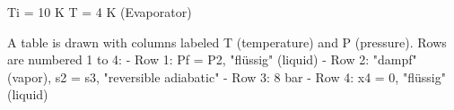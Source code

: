 Ti = 10 K  
T = 4 K (Evaporator)

A table is drawn with columns labeled T (temperature) and P (pressure). Rows are numbered 1 to 4:  
- Row 1: Pf = P2, "flüssig" (liquid)  
- Row 2: "dampf" (vapor), s2 = s3, "reversible adiabatic"  
- Row 3: 8 bar  
- Row 4: x4 = 0, "flüssig" (liquid)